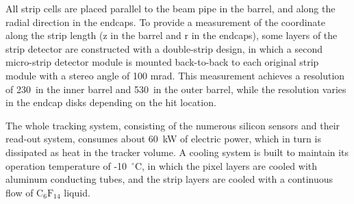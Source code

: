 All strip cells are placed parallel to the beam pipe in the barrel, and along the radial direction in the endcaps.
To provide a measurement of the coordinate along the strip length (z in the barrel and r in the endcaps),
some layers of the strip detector are constructed with a double-strip design, 
in which a second micro-strip detector module is mounted back-to-back to each original strip module with a stereo angle of 100 mrad. 
This measurement achieves a resolution of 230~\mum in the inner barrel and 530~\mum in the outer barrel, 
while the resolution varies in the endcap disks depending on the hit location.

The whole tracking system, consisting of the numerous silicon sensors and their read-out system,
consumes about 60~kW of electric power, which in turn is dissipated as heat in the tracker volume.
A cooling system is built to maintain its operation temperature of -10~${}^{\circ}$C, 
in which the pixel layers are cooled with aluminum conducting tubes, 
and the strip layers are cooled with a continuous flow of $\text{C}_{6}\text{F}_{14}$ liquid.





